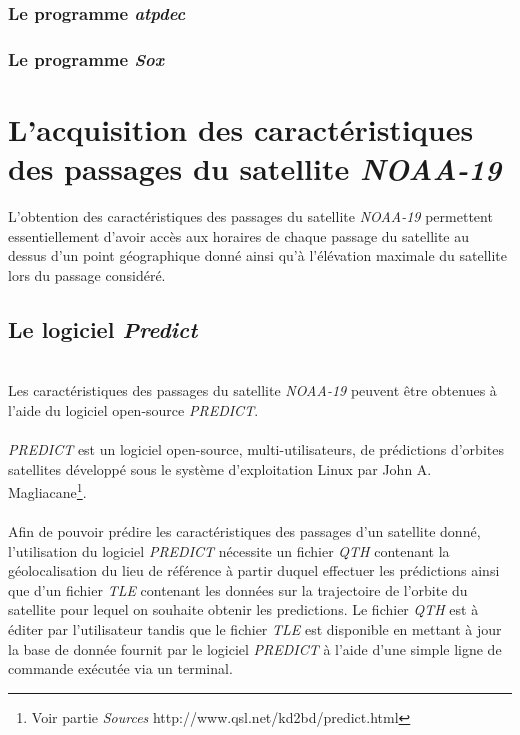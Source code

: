 \documentclass[12pt,fleqn]{book} %
\begin{document}
\subsection{Le programme \emph{atpdec}}
\subsection{Le programme \emph{Sox}}

\chapter{L'acquisition des caractéristiques des passages du satellite \emph{NOAA-19}}
L'obtention des caractéristiques des passages du satellite \emph{NOAA-19} permettent essentiellement d'avoir accès aux horaires de chaque passage du satellite au dessus d'un point géographique donné ainsi qu'à l'élévation maximale du satellite lors du passage considéré.
\section{Le logiciel \emph{Predict}}
~\\\indent Les caractéristiques des passages du satellite \emph{NOAA-19} peuvent être obtenues à l'aide du logiciel open-source \emph{PREDICT}. 
~\\\\\emph{PREDICT} est un logiciel open-source, multi-utilisateurs, de prédictions d'orbites satellites développé sous le système d'exploitation Linux par John A. Magliacane\footnote{Voir partie \emph{Sources} http://www.qsl.net/kd2bd/predict.html}.
~\\\\Afin de pouvoir prédire les caractéristiques des passages d'un satellite donné, l'utilisation du logiciel \emph{PREDICT} nécessite un fichier \emph{QTH} contenant la géolocalisation du lieu de référence à partir duquel effectuer les prédictions ainsi que d'un fichier \emph{TLE} contenant les données sur la trajectoire de l'orbite du satellite pour lequel on souhaite obtenir les predictions. Le fichier \emph{QTH} est à éditer par l'utilisateur tandis que le fichier \emph{TLE} est disponible en mettant à jour la base de donnée fournit par le logiciel \emph{PREDICT} à l'aide d'une simple ligne de commande exécutée via un terminal.
\end{document}
